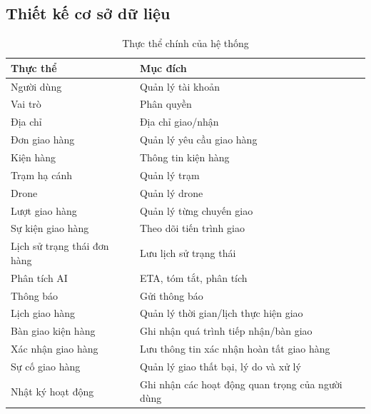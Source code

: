 \subsection{Thiết kế cơ sở dữ liệu}

\begin{longtable}{|L{5cm}|L{9cm}|}
\caption{Thực thể chính của hệ thống}
\label{tab:thuc-the-chinh}
\\
\hline
\textbf{Thực thể} & \textbf{Mục đích} \\
\hline
\endfirsthead

\hline
\endlastfoot

Người dùng
& Quản lý tài khoản \\ \hline

Vai trò
& Phân quyền \\ \hline

Địa chỉ
& Địa chỉ giao/nhận \\ \hline

Đơn giao hàng
& Quản lý yêu cầu giao hàng \\ \hline

Kiện hàng
& Thông tin kiện hàng \\ \hline

Trạm hạ cánh
& Quản lý trạm \\ \hline

Drone
& Quản lý drone \\ \hline

Lượt giao hàng
& Quản lý từng chuyến giao \\ \hline

Sự kiện giao hàng
& Theo dõi tiến trình giao \\ \hline

Lịch sử trạng thái đơn hàng
& Lưu lịch sử trạng thái \\ \hline

Phân tích AI
& ETA, tóm tắt, phân tích \\ \hline

Thông báo
& Gửi thông báo \\ \hline

Lịch giao hàng
& Quản lý thời gian/lịch thực hiện giao \\ \hline

Bàn giao kiện hàng
& Ghi nhận quá trình tiếp nhận/bàn giao \\ \hline

Xác nhận giao hàng
& Lưu thông tin xác nhận hoàn tất giao hàng \\ \hline

Sự cố giao hàng
& Quản lý giao thất bại, lý do và xử lý \\ \hline

Nhật ký hoạt động
& Ghi nhận các hoạt động quan trọng của người dùng \\

\end{longtable}


